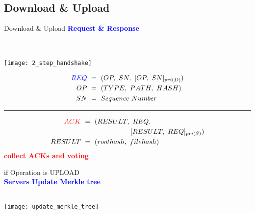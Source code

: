 \subsection{Download \& Upload}
\begin{frame}{Download \& Upload}
	\centering
	\textcolor{blue}{\textbf{Request \& Response}}\\
	~\\
	~\\
	\begin{minipage}{.45\textwidth}
		\texttt{[image: 2\_step\_handshake]}
    \end{minipage}%
	\begin{minipage}{.55\textwidth}
    	\footnotesize
		\centering
		\begin{equation*} \label{eq1}
                \begin{split}
                        \textcolor{blue}{REQ}\ & =\ (OP,\ SN,\ [OP,\ SN]_{pri(D)}) \\
                        OP\ & =\ (TYPE,\ PATH,\ HASH) \\
                        SN\ & =\ Sequence\ Number
                \end{split}
        \end{equation*}
        \hrule{}
        \begin{equation*} \label{eq2}
                \begin{split}
                        \textcolor{red}{ACK}\ & =\ (RESULT,\ REQ,\\
                        & \tab{}\tab{}[RESULT,\ REQ]_{pri(S)}) \\
                        RESULT\ & =\ (roothash,\ filehash)
                \end{split}
        \end{equation*}
        \textcolor{red}{\textbf{collect ACKs and voting}}
    \end{minipage}%
\end{frame}

\begin{frame}{if Operation is UPLOAD}
	\centering
    ~\\
	\textcolor{blue}{\textbf{Servers Update Merkle tree}}\\
	~\\
	\begin{center}
		\texttt{[image: update\_merkle\_tree]}
	\end{center}
\end{frame}

